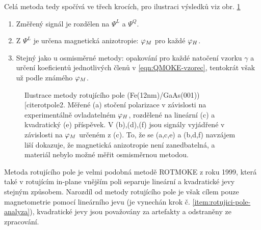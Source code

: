 Celá metoda tedy spočívá ve třech krocích, pro ilustraci výsledků viz obr. \ref{fig:metoda-rotujiciho-pole-vysledky}
\begin{enumerate}
    \item Změřený signál je rozdělen na $\Psi^L$ a $\Psi^Q$.
    \item Z $\Psi^L$ je určena magnetická anizotropie: $\varphi_M$ pro každé $\varphi_H$.
    \item Stejný jako u osmisměrné metody: opakování pro každé natočení vzorku $\gamma$ a určení koeficientů jednotlivých členů v \eqref{eqn:QMOKE-vzorec}, tentokrát však už podle známého $\varphi_M$. \label{item:rotujici-pole-analyza}
\end{enumerate}

\begin{figure}[htbp]
    \centering
    \caption{Ilustrace metody rotujícího pole (Fe(12nm)/GaAs(001)) [cite{rotpole2}.
    Měřené (a) stočení polarizace v závislosti na experimentálně ovladatelném $\varphi_H$, rozdělené na lineární (c) a kvadratický (e) příspěvek. V (b),(d),(f) jsou signály vyjádřené v závislosti na $\varphi_M$ určeném z (c). To, že se (a,c,e) a (b,d,f) navzájem liší dokazuje, že magnetická anizotropie není zanedbatelná, a materiál nebylo možné měřit osmisměrnou metodou.}
    \label{fig:metoda-rotujiciho-pole-vysledky}
\end{figure}

Metoda rotujícího pole je velmi podobná metodě ROTMOKE z roku 1999, která také v rotujícím in-plane vnějším poli separuje lineární a kvadratické jevy stejným způsobem.
Narozdíl od metody rotujícího pole je však cílem pouze magnetometrie pomocí lineárního jevu (je vynechán krok č. \ref{item:rotujici-pole-analyza}), kvadratické jevy jsou považovány za artefakty a odstraněny ze zpracování.
